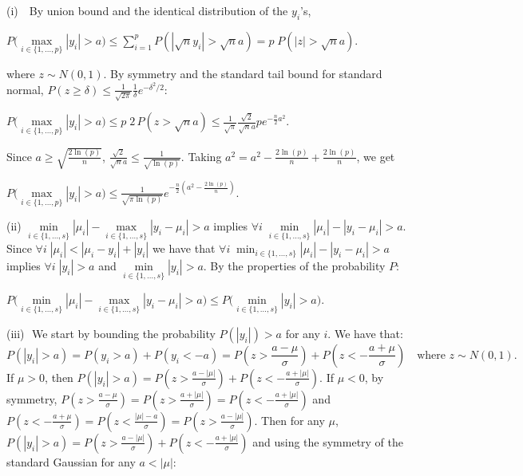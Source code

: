 \documentclass[aos]{imsart}
\theoremstyle{plain}
\begin{document}
	(i) \,\, By union bound and the identical distribution of the $y_i$'s,
\begin{center}
    $P\Big(\underset{i\in\{1,\ldots,p\}}{\max}|y_i|> a \Big)     \leq \sum_{i=1}^{p}{ P\left(|\sqrt{n}y_i|>\sqrt{n}a \right)}
    = p\; P\left(|z|>\sqrt{n}a\right).$
\end{center}
    where $z\sim N(0,1)$. 
    By symmetry and the standard tail bound for standard normal, $P(z \geq \delta) \leq \frac{1}{\sqrt{2\pi}} \frac{1}{\delta} e^{-\delta^{2} / 2}$:
\begin{center}
  $P\Big(\underset{i\in\{1,\ldots,p\}}{\max}|y_i|> a \Big) 
     \leq  p\; 2 \, P\left(z>\sqrt{n}a\right) \leq \frac{1}{\sqrt{\pi}}\frac{\sqrt{2}}{\sqrt{n}a}p e^{-\frac{n}{2} a^{2}}.$
\end{center}
Since $a \geq \sqrt{\frac{2\ln(p)}{n}}$, $\frac{\sqrt{2}}{\sqrt{n}a}\leq \frac{1}{\sqrt{\ln(p)}}$. Taking $a^2=a^2-\frac{2\ln(p)}{n}+\frac{2\ln(p)}{n}$, we get \begin{center}
$ P\Big(\underset{i\in\{1,\ldots,p\}}{\max}|y_i|> a \Big) \leq \frac{1}{\sqrt{\pi\ln(p)}} e^{-\frac{n}{2} \left(a^{2}-\frac{2\ln(p)}{n}\right)}.$ \\\end{center}
(ii) $ \underset{i \in \{1,\ldots,s\}}{\min}|\mu_i|- \underset{i \in \{1,\ldots,s\}}{\max}|y_i-\mu_i| > a$ implies $\forall i \; \underset{i \in \{1,\ldots,s\}}{\min}|\mu_i| - |y_i-\mu_i| > a $. Since $\forall i \; |\mu_i|< |\mu_i-y_i|+|y_i|$ we have that $ \forall i \; \min_{i \in \{1,\ldots,s\}}|\mu_i| - |y_i-\mu_i| > a$ implies $\forall i \; |y_i| > a $ and $ \underset{i \in \{1,\ldots,s\}}{\min}|y_i| > a$. By the properties of the probability $P$: 
\begin{center}$ P\Big(\underset{i \in \{1,\ldots,s\}}{\min}|\mu_i|-\underset{i \in \{1,\ldots,s\}}{\max}|y_i-\mu_i| > a\Big) \leq P\Big(\underset{i \in \{1,\ldots,s\}}{\min}|y_i| > a\Big) $. \end{center}
(iii)\,\, We start by bounding the probability $P(|y_i|)>a$ for any $i$. We have that:
$$P(|y_i|>a) = P(y_i>a) + P(y_i<-a) = P(z>\frac{a-\mu}{\sigma}) + P(z<-\frac{a+\mu}{\sigma}) \quad \text{where }z\sim N(0,1).$$
If $\mu>0$, then $P(|y_i|>a) =  P(z>\frac{a-|\mu|}{\sigma}) + P(z<-\frac{a+|\mu|}{\sigma})$. If $\mu<0$, by symmetry, $P(z>\frac{a-\mu}{\sigma})=P(z>\frac{a+|\mu|}{\sigma})=P(z<-\frac{a+|\mu|}{\sigma})$ and $P(z<-\frac{a+\mu}{\sigma})=P(z<\frac{|\mu|-a}{\sigma})=P(z>\frac{a-|\mu|}{\sigma})$. Then for any $\mu$, $P(|y_i|>a)  = P(z>\frac{a-|\mu|}{\sigma}) + P(z<-\frac{a+|\mu|}{\sigma}) $ and using the symmetry of the standard Gaussian for any $a<|\mu|$: 
\end{document}

